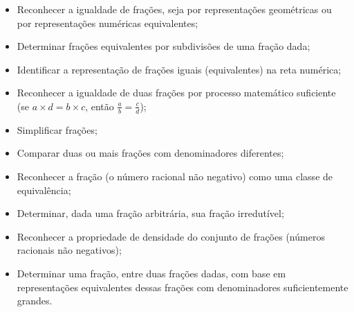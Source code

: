 \documentclass[oneside]{book}
\begin{document}
\begin{itemize} %
    \item       Reconhecer a igualdade de frações, seja por representações 
geométricas ou por representações numéricas equivalentes;
    \item       Determinar frações equivalentes por subdivisões de uma fração 
dada;
    \item       Identificar a representação de frações iguais (equivalentes) na 
reta numérica;
    \item       Reconhecer a igualdade de duas frações por processo matemático 
suficiente (se       $a \times d = b \times c$, então       $\frac{a}{b} = 
\frac{c}{d}$);
    \item       Simplificar frações;
    \item       Comparar duas ou mais frações com denominadores diferentes;
    \item       Reconhecer a fração (o número racional não negativo) como uma 
classe de equivalência;
    \item       Determinar, dada uma fração arbitrária, sua fração irredutível;
    \item       Reconhecer a propriedade de densidade do conjunto de frações 
(números racionais não negativos);
    \item       Determinar uma fração, entre duas frações dadas, com base em 
representações equivalentes dessas frações com denominadores suficientemente 
grandes.
\end{itemize} %
\end{document}
